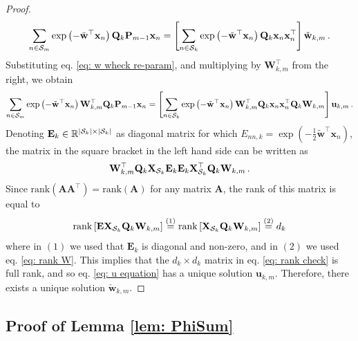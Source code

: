 \documentclass[twoside,11pt,english]{article}
\begin{document}
\begin{proof}
\[
\sum_{n\in\mathcal{S}_{m}}\exp\left(-\tilde{\mathbf{w}}^{\top}\mathbf{x}_{n}\right)\mathbf{Q}_{k}\mathbf{P}_{m-1}\mathbf{x}_{n}=\left[\sum_{n\in\mathcal{S}_{k}}\exp\left(-\tilde{\mathbf{w}}^{\top}\mathbf{x}_{n}\right)\mathbf{Q}_{k}\mathbf{x}_{n}\mathbf{x}_{n}^{\top}\right]\check{\mathbf{w}}_{k,m}\,.
\]
Substituting eq. \ref{eq: w wheck re-param}, and multiplying by $\mathbf{W}_{k,m}^{\top}$
from the right, we obtain
\begin{equation}
\sum_{n\in\mathcal{S}_{m}}\exp\left(-\tilde{\mathbf{w}}^{\top}\mathbf{x}_{n}\right)\mathbf{W}_{k,m}^{\top}\mathbf{Q}_{k}\mathbf{P}_{m-1}\mathbf{x}_{n}=\left[\sum_{n\in\mathcal{S}_{k}}\exp\left(-\tilde{\mathbf{w}}^{\top}\mathbf{x}_{n}\right)\mathbf{W}_{k,m}^{\top}\mathbf{Q}_{k}\mathbf{x}_{n}\mathbf{x}_{n}^{\top}\mathbf{Q}_{k}\mathbf{W}_{k,m}\right]\mathbf{u}_{k,m}\,.\label{eq: u equation}
\end{equation}
Denoting $\mathbf{E}_{k}\in\mathbb{R}^{\left|\mathcal{S}_{k}\right|\times\left|\mathcal{S}_{k}\right|}$
as diagonal matrix for which $E_{nn,k}=\exp\left(-\frac{1}{2}\tilde{\mathbf{w}}^{\top}\mathbf{x}_{n}\right)$,
the matrix in the square bracket in the left hand side can be written
as
\begin{equation}
\mathbf{W}_{k,m}^{\top}\mathbf{Q}_{k}\mathbf{X}_{\mathcal{S}_{k}}\mathbf{E}_{k}\mathbf{E}_{k}\mathbf{X}_{\mathcal{S}_{k}}^{\top}\mathbf{Q}_{k}\mathbf{W}_{k,m}\,.\label{eq: rank check}
\end{equation}
Since $\mathrm{rank}\left(\mathbf{A}\mathbf{A}^{\top}\right)=\mathrm{rank}\left(\mathbf{A}\right)$
for any matrix $\mathbf{A}$, the rank of this matrix is equal to
\[
\mathrm{rank}\left[\mathbf{E}\mathbf{X}_{\mathcal{S}_{k}}\mathbf{Q}_{k}\mathbf{W}_{k,m}\right]\overset{\left(1\right)}{=}\mathrm{rank}\left[\mathbf{X}_{\mathcal{S}_{k}}\mathbf{Q}_{k}\mathbf{W}_{k,m}\right]\overset{\left(2\right)}{=}d_{k}
\]
where in $\left(1\right)$ we used that $\mathbf{E}_{k}$ is diagonal
and non-zero, and in $\left(2\right)$ we used eq. \ref{eq: rank W}.
This implies that the $d_{k}\times d_{k}$ matrix in eq. \ref{eq: rank check}
is full rank, and so eq. \ref{eq: u equation} has a unique solution
$\mathbf{u}_{k,m}$. Therefore, there exists a unique solution $\check{\mathbf{w}}_{k,m}$.
\end{proof}

\subsection{Proof of Lemma \ref{lem: PhiSum}} \label{subsec: PhiSumProof}
\end{document}
